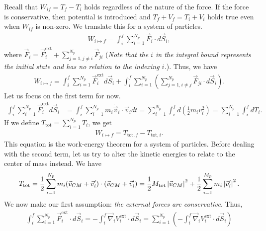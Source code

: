 Recall that $W_{if} = T_{f} - T_{i}$ holds regardless of the nature of the force. If the force is conservative, then potential is introduced and $T_{f} + V_{f} = T_{i} + V_{i}$ holds true even when $W_{if}$ is non-zero. We translate this for a system of particles.
\begin{align}
    W_{i \mapsto f} = \int_{i}^{f} \sum_{i=1}^{N_{p}} \vec{F}_{i} \cdot d\vec{S}_{i},
\end{align}
where $\vec{F}_{i} = \vec{F}_{i}^{\text{ext}} + \sum_{j=1, j \neq i}^{N_{p}} \vec{F}_{ji}$ (\textit{Note that the $i$ in the integral bound represents the initial state and has no relation to the indexing $i$.}). Thus, we have
\begin{align}
    W_{i \mapsto f} = \int_{i}^{f} \sum_{i=1}^{N_{p}} \vec{F}_{i}^{\text{ext}} d\vec{S}_{i} + \int_{i}^{f} \sum_{i=1}^{N_{p}} \left( \sum_{j=1, i \neq j}^{N_{p}} \vec{F}_{ji} \cdot d\vec{S}_{i} \right).
\end{align}
Let us focus on the first term for now.
\begin{align}
    \int_{i}^{f} \sum_{i=1}^{N_{p}} \vec{F}_{i}^{\text{ext}} d\vec{S}_{i} &= \int_{i}^{f} \sum_{i=1}^{N_{p}} m_{i} \dot{\vec{v}}_{i} \cdot \vec{v}_{i} dt = \sum_{i=1}^{N_{p}} \int_{i}^{f} d \left( \frac{1}{2} m_{i}v_{i}^{2} \right) = \sum_{i=1}^{N_{p}} \int_{i}^{f} dT_{i}.
\end{align}
If we define $T_{\text{tot}} = \sum_{i=1}^{N_{p}} T_{i}$, we get
\begin{align}
    W_{i \mapsto f} = T_{\text{tot},f} - T_{\text{tot},i}.
\end{align}
This equation is the work-energy theorem for a system of particles. Before dealing with the second term, let us try to alter the kinetic energies to relate to the center of mass instead. We have
\begin{align}
    T_{\text{tot}} = \frac{1}{2} \sum_{i=1}^{N_{p}} m_{i}(\vec{v}_{CM} + \vec{v}'_{i}) \cdot (\vec{v}_{CM} + \vec{v}'_{i}) = \frac{1}{2}M_{\text{tot}}\left| \vec{v}_{CM} \right|^{2} + \frac{1}{2} \sum_{i=1}^{M_{p}} m_{i} \left| \vec{v}'_{i} \right|^{2}.
\end{align}
We now make our first assumption: \textit{the external forces are conservative}. Thus,
\begin{align}
    \int_{i}^{f} \sum_{i=1}^{N_{p}} \vec{F}_{i}^{\text{ext}} \cdot d\vec{S}_{i} = - \int_{i}^{f} \vec{\nabla}_{i} V_{i}^{\text{ext}} \cdot d\vec{S}_{i} = \sum_{i=1}^{N_{p}} \left( - \int_{i}^{f} \vec{\nabla}_{i} V_{i}^{\text{ext}} \cdot d\vec{S}_{i} \right)
\end{align}
